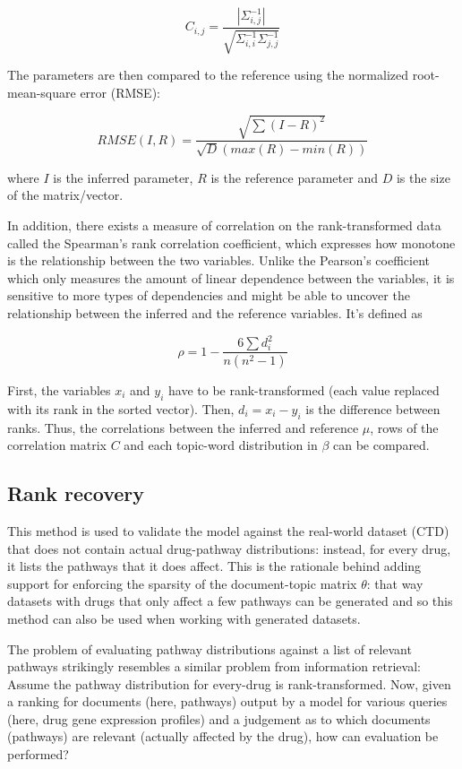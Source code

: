\documentclass[12pt,a4paper,twoside,openright]{report}
\begin{document}
\begin{equation}
C_{i, j} = \frac{|\Sigma^{-1}_{i, j}|}{\sqrt{\Sigma^{-1}_{i, i}\Sigma^{-1}_{j, j}}}
\end{equation}

The parameters are then compared to the reference using the normalized root-mean-square error (RMSE):

\begin{equation}
\mathit{RMSE}(I, R) = \frac{\sqrt{\sum{(I-R)^2}}}{\sqrt{D}(max(R) - min(R))}
\end{equation}

where $I$ is the inferred parameter, $R$ is the reference parameter and $D$ is the size of the matrix/vector.

In addition, there exists a measure of correlation on the rank-transformed data called the Spearman's rank correlation coefficient, which expresses how monotone is the relationship between the two variables. Unlike the Pearson's coefficient which only measures the amount of linear dependence between the variables, it is sensitive to more types of dependencies and might be able to uncover the relationship between the inferred and the reference variables. It's defined as 

\begin{equation}
\rho  = 1 - \frac{6\sum d^2_i}{n ( n^2-1)}
\end{equation}

First, the variables $x_i$ and $y_i$ have to be rank-transformed (each value replaced with its rank in the sorted vector). Then, $d_i = x_i - y_i$ is the difference between ranks. Thus, the correlations between the inferred and reference $\mu$, rows of the correlation matrix $C$ and each topic-word distribution in $\beta$ can be compared.

\subsection{Rank recovery}

This method is used to validate the model against the real-world dataset (CTD) that does not contain actual drug-pathway distributions: instead, for every drug, it lists the pathways that it does affect. This is the rationale behind adding support for enforcing the sparsity of the document-topic matrix $\theta$: that way datasets with drugs that only affect a few pathways can be generated and so this method can also be used when working with generated datasets.

The problem of evaluating pathway distributions against a list of relevant pathways strikingly resembles a similar problem from information retrieval: Assume the pathway distribution for every-drug is rank-transformed. Now, given a ranking for documents (here, pathways) output by a model for various queries (here, drug gene expression profiles) and a judgement as to which documents (pathways) are relevant (actually affected by the drug), how can evaluation be performed?
\end{document}
